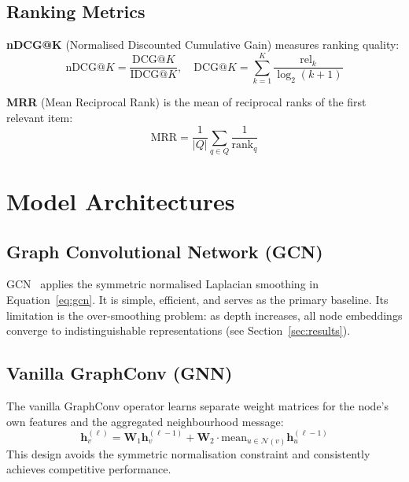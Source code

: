 \documentclass[12pt,a4paper]{article}
\begin{document}
\subsection{Ranking Metrics}

\textbf{nDCG@K} (Normalised Discounted Cumulative Gain) measures ranking quality:
\begin{equation}
\text{nDCG@}K = \frac{\text{DCG@}K}{\text{IDCG@}K}, \quad \text{DCG@}K = \sum_{k=1}^{K}\frac{\text{rel}_k}{\log_2(k+1)}
\end{equation}

\textbf{MRR} (Mean Reciprocal Rank) is the mean of reciprocal ranks of the first relevant item:
\begin{equation}
\text{MRR} = \frac{1}{|Q|}\sum_{q \in Q}\frac{1}{\text{rank}_q}
\end{equation}

\section{Model Architectures}
\label{sec:architectures}

\subsection{Graph Convolutional Network (GCN)}

GCN~\cite{kipf2017} applies the symmetric normalised Laplacian smoothing in Equation~\ref{eq:gcn}. It is simple, efficient, and serves as the primary baseline. Its limitation is the over-smoothing problem: as depth increases, all node embeddings converge to indistinguishable representations (see Section~\ref{sec:results}).

\subsection{Vanilla GraphConv (GNN)}

The vanilla GraphConv operator learns separate weight matrices for the node's own features and the aggregated neighbourhood message:
\begin{equation}
\mathbf{h}_v^{(\ell)} = \mathbf{W}_1\mathbf{h}_v^{(\ell-1)} + \mathbf{W}_2 \cdot \text{mean}_{u \in \mathcal{N}(v)} \mathbf{h}_u^{(\ell-1)}
\end{equation}
This design avoids the symmetric normalisation constraint and consistently achieves competitive performance.
\end{document}
